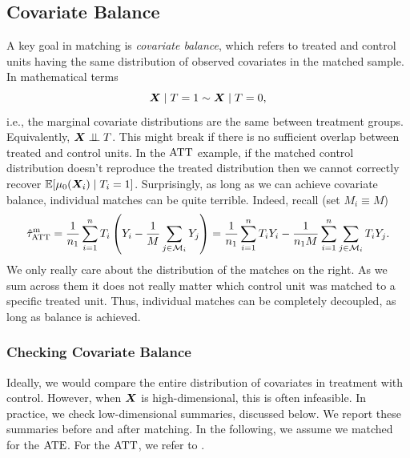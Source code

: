 \documentclass[11pt]{exam}
\begin{document}
\subsection{Covariate Balance}
A key goal in matching is \emph{covariate balance}, which refers to treated and control units having the same distribution of observed covariates in the matched sample. In mathematical terms
\[
    \bm{X} \mid T = 1 \sim \bm{X} \mid T = 0, 
\]
i.e., the marginal covariate distributions are the same between treatment groups. Equivalently, $\bm{X} \perp\!\!\!\perp T$. This might break if there is no sufficient overlap between treated and control units.
In the $\mathrm{ATT}$ example, if the matched control distribution doesn't reproduce the treated distribution then we cannot correctly recover $\mathbb{E}[\mu_0(\bm{X}_i) \mid T_i = 1]$. 
Surprisingly, as long as we can achieve covariate balance, individual matches can be quite terrible. Indeed, recall (set $M_i \equiv M$)
\[
    \hat \tau^\mathrm{m}_{\mathrm{ATT}} = \frac{1}{n_1} \sum_{i=1}^n  T_i \left(Y_i - \frac{1}{M} \sum_{j \in \mathcal{M}_i} Y_j \right) = \frac{1}{n_1} \sum_{i=1}^n  T_i Y_i - \frac{1}{n_1 M} \sum_{i=1}^n \sum_{j \in \mathcal{M}_i} T_i Y_j.
\]
We only really care about the distribution of the matches on the right. As we sum across them it does not really matter which control unit was matched to a specific treated unit. Thus, individual matches can be completely decoupled, as long as balance is achieved.


\subsubsection{Checking Covariate Balance}
Ideally, we would compare the entire distribution of covariates in treatment with control. However, when $\bm{X}$ is high-dimensional, this is often infeasible. In practice, we check low-dimensional summaries, discussed below. We report these summaries before and after matching. In the following, we assume we matched for the $\mathrm{ATE}$. For the $\mathrm{ATT}$, we refer to \citet{chazal2024causalcoursenotes}.
\end{document}
